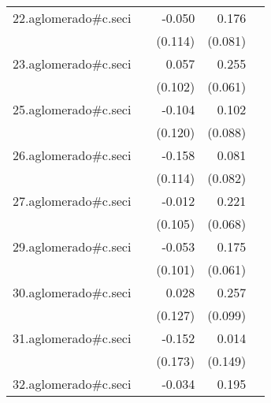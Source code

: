 {\begin{longtable}{l*{4}{D{.}{.}{-1}}}
\addlinespace
22.aglomerado#c.seci&                     &      -0.050         &       0.176\sym{*}  &                     \\
            &                     &     (0.114)         &     (0.081)         &                     \\
\addlinespace
23.aglomerado#c.seci&                     &       0.057         &       0.255\sym{***}&                     \\
            &                     &     (0.102)         &     (0.061)         &                     \\
\addlinespace
25.aglomerado#c.seci&                     &      -0.104         &       0.102         &                     \\
            &                     &     (0.120)         &     (0.088)         &                     \\
\addlinespace
26.aglomerado#c.seci&                     &      -0.158         &       0.081         &                     \\
            &                     &     (0.114)         &     (0.082)         &                     \\
\addlinespace
27.aglomerado#c.seci&                     &      -0.012         &       0.221\sym{**} &                     \\
            &                     &     (0.105)         &     (0.068)         &                     \\
\addlinespace
29.aglomerado#c.seci&                     &      -0.053         &       0.175\sym{**} &                     \\
            &                     &     (0.101)         &     (0.061)         &                     \\
\addlinespace
30.aglomerado#c.seci&                     &       0.028         &       0.257\sym{**} &                     \\
            &                     &     (0.127)         &     (0.099)         &                     \\
\addlinespace
31.aglomerado#c.seci&                     &      -0.152         &       0.014         &                     \\
            &                     &     (0.173)         &     (0.149)         &                     \\
\addlinespace
32.aglomerado#c.seci&                     &      -0.034         &       0.195\sym{*}  &                     \\

\end{longtable}}
